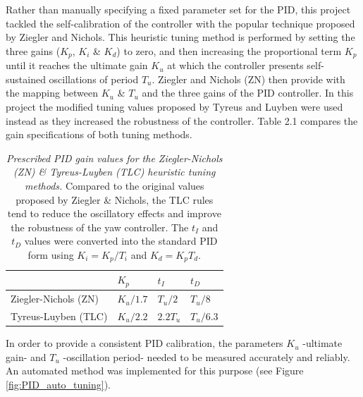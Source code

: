 \documentclass[12pt,twoside]{report}
\begin{document}
Rather than manually specifying a fixed parameter set for the PID, this project tackled the self-calibration of the controller with the popular technique proposed by Ziegler and Nichols\cite{ziegler1942optimum}. This heuristic tuning method is performed by setting the three gains ($K_p$, $K_i$ \& $K_d$) to zero, and then increasing the proportional term $K_p$ until it reaches the ultimate gain $K_u$ at which the controller presents self-sustained oscillations of period $T_u$.
Ziegler and Nichols (ZN) then provide with the mapping between $K_u$ \& $T_u$ and the three gains of the PID controller.
In this project the modified tuning values proposed by Tyreus and Luyben\cite{luyben1997essentials} were used instead as they increased the robustness of the controller. Table 2.1 compares the gain specifications of both tuning methods.


\begin{table}[hbtp]
\centering
\begin{tabular}{l|l|l|l|}
\cline{2-4}
                                                              & \cellcolor[HTML]{EFEFEF}$K_p$ & \cellcolor[HTML]{EFEFEF}$t_I$ & \cellcolor[HTML]{EFEFEF}$t_D$ \\ \hline
\multicolumn{1}{|l|}{\cellcolor[HTML]{EFEFEF}Ziegler-Nichols (ZN)} & $K_u/1.7$                     & $T_u/2$                       & $T_u/8$                       \\ \hline
\multicolumn{1}{|l|}{\cellcolor[HTML]{EFEFEF}Tyreus-Luyben (TLC)}   & $K_u/2.2$                     & $2.2T_u$                      & $T_u/6.3$                     \\ \hline
\end{tabular}
\caption{\emph{Prescribed PID gain values for the Ziegler-Nichols (ZN) \& Tyreus-Luyben (TLC) heuristic tuning methods.}
Compared to the original values proposed by Ziegler \& Nichols, the TLC rules tend to reduce the oscillatory effects and improve the robustness of the yaw controller.
The $t_I$ and $t_D$ values were converted into the standard PID form using $K_i = K_p/T_i$ and $K_d = K_pT_d$.
}
\label{my-label}
\end{table}

In order to provide a consistent PID calibration, the parameters $K_u$ -ultimate gain- and $T_u$ -oscillation period- needed to be measured accurately and reliably. An automated method was implemented for this purpose (see Figure \ref{fig:PID_auto_tuning}).
\end{document}
